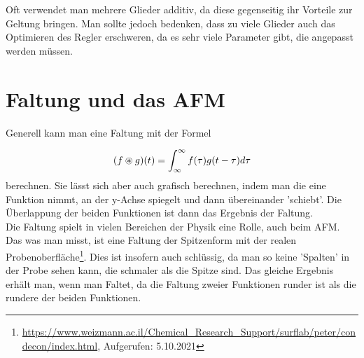 Oft verwendet man mehrere Glieder additiv, da diese gegenseitig ihr Vorteile zur Geltung bringen. Man sollte jedoch bedenken, dass zu viele Glieder auch das 
Optimieren des Regler erschweren, da es sehr viele Parameter gibt, die angepasst werden müssen.


\section{Faltung und das AFM}

Generell kann man eine Faltung mit der Formel 

\begin{equation*}
    (f \circledast g)(t) = \int_{\-\infty}^\infty f(\tau)g(t-\tau) d\tau
\end{equation*}
berechnen. Sie lässt sich aber auch grafisch berechnen, indem man die eine Funktion nimmt, an der y-Achse spiegelt und dann übereinander 'schiebt'. 
Die Überlappung der beiden Funktionen ist dann das Ergebnis der Faltung. \\

Die Faltung spielt in vielen Bereichen der Physik eine Rolle, auch beim AFM. Das was man misst, ist eine Faltung der Spitzenform mit der realen Probenoberfläche\footnote{\url{https://www.weizmann.ac.il/Chemical_Research_Support/surflab/peter/condecon/index.html}, Aufgerufen: 5.10.2021}. 
Dies ist insofern auch schlüssig, da man so keine 'Spalten' in der Probe sehen kann, die schmaler als die Spitze sind. Das gleiche Ergebnis erhält man, wenn man Faltet, da die Faltung 
zweier Funktionen runder ist als die rundere der beiden Funktionen.